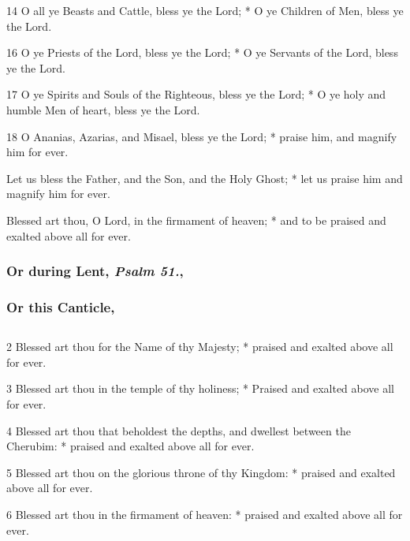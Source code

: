 14 O all ye Beasts and Cattle, bless ye the Lord; * O ye Children of Men, bless ye the Lord.


16 O ye Priests of the Lord, bless ye the Lord; * O ye Servants of the Lord, bless ye the Lord.

17 O ye Spirits and Souls of the Righteous, bless ye the Lord; * O ye holy and humble Men of heart, bless ye the Lord.

18 O Ananias, Azarias, and Misael, bless ye the Lord; * praise him, and magnify him for ever.

Let us bless the Father, and the Son, and the Holy Ghost; * let us praise him and magnify him for ever.

Blessed art thou, O Lord, in the firmament of heaven; * and to be praised and exalted above all for ever.

\subsubsection{Or during Lent, \emph{Psalm 51.},}
\subsubsection{Or this Canticle,}

\subsection{}

2 Blessed art thou for the Name of thy Majesty; * praised and exalted above all for ever.

3 Blessed art thou in the temple of thy holiness; * Praised and exalted above all for ever.

4 Blessed art thou that beholdest the depths, and dwellest between the Cherubim: * praised and exalted above all for ever.

5 Blessed art thou on the glorious throne of thy Kingdom: * praised and exalted above all for ever.

6 Blessed art thou in the firmament of heaven: * praised and exalted above all for ever.


